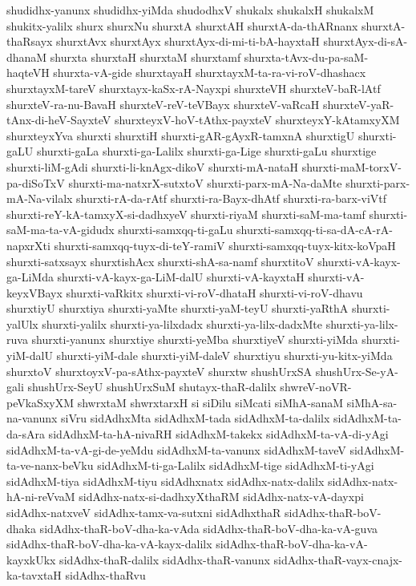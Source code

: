 {shudidhx-yanunx
shudidhx-yiMda
shudodhxV
shukalx
shukalxH
shukalxM
shukitx-yalilx
shurx
shurxNu
shurxtA
shurxtAH
shurxtA-da-thARnanx
shurxtA-thaRsayx
shurxtAvx
shurxtAyx
shurxtAyx-di-mi-ti-bA-hayxtaH
shurxtAyx-di-sA-dhanaM
shurxta
shurxtaH
shurxtaM
shurxtamf
shurxta-tAvx-du-pa-saM-haqteVH
shurxta-vA-gide
shurxtayaH
shurxtayxM-ta-ra-vi-roV-dhashacx
shurxtayxM-tareV
shurxtayx-kaSx-rA-Nayxpi
shurxteVH
shurxteV-baR-lAtf
shurxteV-ra-nu-BavaH
shurxteV-reV-teVBayx
shurxteV-vaRcaH
shurxteV-yaR-tAnx-di-heV-SayxteV
shurxteyxV-hoV-tAthx-payxteV
shurxteyxY-kAtamxyXM
shurxteyxYva
shurxti
shurxtiH
shurxti-gAR-gAyxR-tamxnA
shurxtigU
shurxti-gaLU
shurxti-gaLa
shurxti-ga-Lalilx
shurxti-ga-Lige
shurxti-gaLu
shurxtige
shurxti-liM-gAdi
shurxti-li-knAgx-dikoV
shurxti-mA-nataH
shurxti-maM-torxV-pa-diSoTxV
shurxti-ma-natxrX-sutxtoV
shurxti-parx-mA-Na-daMte
shurxti-parx-mA-Na-vilalx
shurxti-rA-da-rAtf
shurxti-ra-Bayx-dhAtf
shurxti-ra-barx-viVtf
shurxti-reY-kA-tamxyX-si-dadhxyeV
shurxti-riyaM
shurxti-saM-ma-tamf
shurxti-saM-ma-ta-vA-gidudx
shurxti-samxqq-ti-gaLu
shurxti-samxqq-ti-sa-dA-cA-rA-napxrXti
shurxti-samxqq-tuyx-di-teY-ramiV
shurxti-samxqq-tuyx-kitx-koVpaH
shurxti-satxsayx
shurxtishAcx
shurxti-shA-sa-namf
shurxtitoV
shurxti-vA-kayx-ga-LiMda
shurxti-vA-kayx-ga-LiM-dalU
shurxti-vA-kayxtaH
shurxti-vA-keyxVBayx
shurxti-vaRkitx
shurxti-vi-roV-dhataH
shurxti-vi-roV-dhavu
shurxtiyU
shurxtiya
shurxti-yaMte
shurxti-yaM-teyU
shurxti-yaRthA
shurxti-yalUlx
shurxti-yalilx
shurxti-ya-lilxdadx
shurxti-ya-lilx-dadxMte
shurxti-ya-lilx-ruva
shurxti-yanunx
shurxtiye
shurxti-yeMba
shurxtiyeV
shurxti-yiMda
shurxti-yiM-dalU
shurxti-yiM-dale
shurxti-yiM-daleV
shurxtiyu
shurxti-yu-kitx-yiMda
shurxtoV
shurxtoyxV-pa-sAthx-payxteV
shurxtw
shushUrxSA
shushUrx-Se-yA-gali
shushUrx-SeyU
shushUrxSuM
shutayx-thaR-dalilx
shwreV-noVR-peVkaSxyXM
shwrxtaM
shwrxtarxH
si
siDilu
siMcati
siMhA-sanaM
siMhA-sa-na-vanunx
siVru
sidAdhxMta
sidAdhxM-tada
sidAdhxM-ta-dalilx
sidAdhxM-ta-da-sAra
sidAdhxM-ta-hA-nivaRH
sidAdhxM-takekx
sidAdhxM-ta-vA-di-yAgi
sidAdhxM-ta-vA-gi-de-yeMdu
sidAdhxM-ta-vanunx
sidAdhxM-taveV
sidAdhxM-ta-ve-nanx-beVku
sidAdhxM-ti-ga-Lalilx
sidAdhxM-tige
sidAdhxM-ti-yAgi
sidAdhxM-tiya
sidAdhxM-tiyu
sidAdhxnatx
sidAdhx-natx-dalilx
sidAdhx-natx-hA-ni-reVvaM
sidAdhx-natx-si-dadhxyXthaRM
sidAdhx-natx-vA-dayxpi
sidAdhx-natxveV
sidAdhx-tamx-va-sutxni
sidAdhxthaR
sidAdhx-thaR-boV-dhaka
sidAdhx-thaR-boV-dha-ka-vAda
sidAdhx-thaR-boV-dha-ka-vA-guva
sidAdhx-thaR-boV-dha-ka-vA-kayx-dalilx
sidAdhx-thaR-boV-dha-ka-vA-kayxkUkx
sidAdhx-thaR-dalilx
sidAdhx-thaR-vanunx
sidAdhx-thaR-vayx-cnajx-ka-tavxtaH
sidAdhx-thaRvu
}
